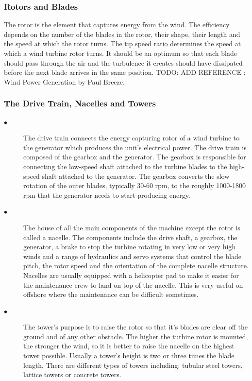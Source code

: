 \documentclass[twosided,a4,10pt]{article}
\begin{document}
\begin{multicols}{2}
 \subsubsection{Rotors and Blades}
 The rotor is the element that captures energy from the wind. The efficiency depends on the number of the blades in the rotor, their shape, their length and the speed at which the rotor turns. The tip speed ratio determines the speed at which a wind turbine rotor turns. It should be an optimum so that each blade should pass through the air and the turbulence it creates should have dissipated before the next blade arrives in the same position.
 TODO: ADD REFERENCE : Wind Power Generation by Paul Breeze. 
\subsubsection{The Drive Train, Nacelles and Towers}
\begin{description}
\item[$\bullet$] 
The drive train connects the energy capturing rotor of a wind turbine to the generator which produces the unit's electrical power. The drive train is composed of the gearbox and the generator. The gearbox is responsible for connecting the low-speed shaft attached to the turbine blades to the high-speed shaft attached to the generator. The gearbox converts the slow rotation of the outer blades, typically 30-60 rpm, to the roughly 1000-1800 rpm that the generator needs to start producing energy.
\item[$\bullet$] 
The house of all the main components of the machine except the rotor is called a nacelle. The components include the drive shaft, a gearbox, the generator, a brake to stop the turbine rotating in very low or very high winds and a range of hydraulics and servo systems that control the blade pitch, the rotor speed and the orientation of the complete nacelle structure. Nacelles are usually equipped with a helicopter pad to make it easier for the maintenance crew to land on top of the nacelle. This is very useful on offshore where the maintenance can be difficult sometimes. 
\item[$\bullet$] 
The tower's purpose is to raise the rotor so that it's blades are clear off the ground and of any other obstacle. The higher the turbine rotor is mounted, the stronger the wind, so it is better to raise the nacelle on the highest tower possible. Usually a tower's height is two or three times the blade length. There are different types of towers including: tubular steel towers, lattice towers or concrete towers.


\end{description}
\end{multicols}
\end{document}
